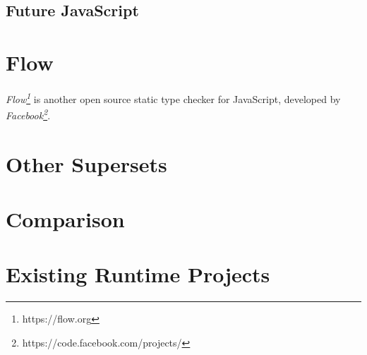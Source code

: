 
\subsection{Future JavaScript}
\label{sec:ts-future-javascript}

 


 
\section{Flow}
\label{sec:flow}

\emph{Flow\footnote{https://flow.org}} is another open source static type checker for JavaScript, developed by \emph{Facebook\footnote{https://code.facebook.com/projects/}}.

\section{Other Supersets}
\label{sec:other-supersets}

\section{Comparison}
\label{sec:comparison}

\section{Existing Runtime Projects}
\label{sec:existing-projects}
